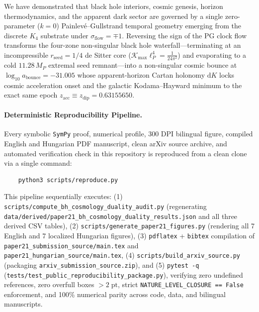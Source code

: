 \documentclass[11pt,a4paper]{article}
\theoremstyle{remark}
\begin{document}
We have demonstrated that black hole interiors, cosmic genesis, horizon thermodynamics, and the apparent dark sector are governed by a single zero-parameter ($k = 0$) Painlev\'e--Gullstrand temporal geometry emerging from the discrete $K_4$ substrate under $\sigma_{\mathrm{flow}} = \mp 1$. Reversing the sign of the PG clock flow transforms the four-zone non-singular black hole waterfall---terminating at an incompressible $r_{\mathrm{seed}} = 1/4$ de Sitter core ($\mathcal{K}_{\max}\ell_P^4 = \frac{1}{24\pi^2}$) and evaporating to a cold $11.28\,M_P$ extremal seed remnant---into a non-singular cosmic bounce at $\log_{10} a_{\mathrm{bounce}} = -31.005$ whose apparent-horizon Cartan holonomy $\mathrm{d}K$ locks cosmic acceleration onset and the galactic Kodama--Hayward minimum to the exact same epoch $z_{\mathrm{acc}} \equiv z_{\mathrm{dip}} = 0.63155650$.

\paragraph{Deterministic Reproducibility Pipeline.}
Every symbolic \texttt{SymPy} proof, numerical profile, 300 DPI bilingual figure, compiled English and Hungarian PDF manuscript, clean arXiv source archive, and automated verification check in this repository is reproduced from a clean clone via a single command:
\begin{verbatim}
    python3 scripts/reproduce.py
\end{verbatim}
This pipeline sequentially executes: (1) \texttt{scripts/\allowbreak compute\_\allowbreak bh\_\allowbreak cosmology\_\allowbreak duality\_\allowbreak audit.py} (regenerating \texttt{data/\allowbreak derived/\allowbreak paper21\_\allowbreak bh\_\allowbreak cosmology\_\allowbreak duality\_\allowbreak results.json} and all three derived CSV tables), (2) \texttt{scripts/\allowbreak generate\_\allowbreak paper21\_\allowbreak figures.py} (rendering all 7 English and 7 localized Hungarian figures), (3) \texttt{pdflatex} + \texttt{bibtex} compilation of \texttt{paper21\_\allowbreak submission\_\allowbreak source/\allowbreak main.tex} and \texttt{paper21\_\allowbreak hungarian\_\allowbreak source/\allowbreak main.tex}, (4) \texttt{scripts/\allowbreak build\_\allowbreak arxiv\_\allowbreak source.py} (packaging \texttt{arxiv\_\allowbreak submission\_\allowbreak source.zip}), and (5) \texttt{pytest -q} (\texttt{tests/\allowbreak test\_\allowbreak public\_\allowbreak reproducibility\_\allowbreak package.py}), verifying zero undefined references, zero overfull boxes $> 2\;\mathrm{pt}$, strict \texttt{NATURE\_\allowbreak LEVEL\_\allowbreak CLOSURE == False} enforcement, and 100\% numerical parity across code, data, and bilingual manuscripts.



\end{document}
